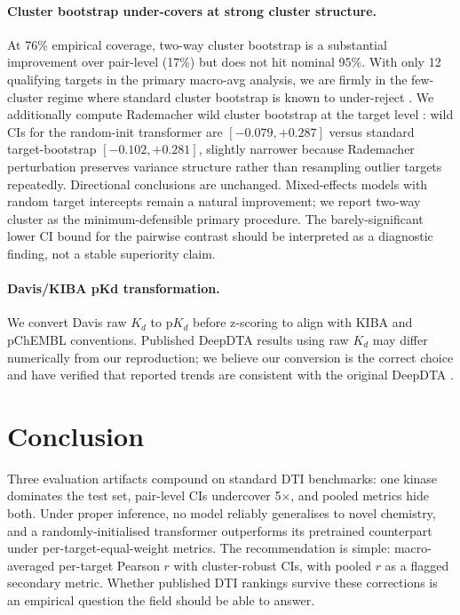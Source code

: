 \documentclass[11pt,a4paper]{article}
\begin{document}
\paragraph{Cluster bootstrap under-covers at strong cluster structure.}
At 76\% empirical coverage, two-way cluster bootstrap is a substantial
improvement over pair-level (17\%) but does not hit nominal 95\%.
With only 12 qualifying targets in the primary macro-avg analysis, we are
firmly in the few-cluster regime where standard cluster bootstrap is known
to under-reject \citep{mackinnon2017wild}.
We additionally compute Rademacher wild cluster bootstrap at the target level
\citep{mackinnon2017wild}: wild CIs for the random-init transformer
are $[-0.079, +0.287]$ versus standard target-bootstrap $[-0.102, +0.281]$,
slightly narrower because Rademacher perturbation preserves variance
structure rather than resampling outlier targets repeatedly.
Directional conclusions are unchanged.
Mixed-effects models with random target intercepts remain a natural
improvement; we report two-way cluster as the minimum-defensible primary
procedure.
The barely-significant lower CI bound for the pairwise contrast should
be interpreted as a diagnostic finding, not a stable superiority claim.

\paragraph{Davis/KIBA pKd transformation.}
We convert Davis raw $K_d$ to $\text{p}K_d$ before z-scoring to align with KIBA
and pChEMBL conventions.
Published DeepDTA results using raw $K_d$ may differ numerically from our
reproduction; we believe our conversion is the correct choice and have
verified that reported trends are consistent with the original DeepDTA
\citep{ozturk2018deepdta}.

\section{Conclusion}

Three evaluation artifacts compound on standard DTI benchmarks: one kinase
dominates the test set, pair-level CIs undercover 5$\times$, and pooled metrics
hide both.
Under proper inference, no model reliably generalises to novel chemistry, and a
randomly-initialised transformer outperforms its pretrained counterpart under
per-target-equal-weight metrics.
The recommendation is simple: macro-averaged per-target Pearson $r$ with
cluster-robust CIs, with pooled $r$ as a flagged secondary metric.
Whether published DTI rankings survive these corrections is an empirical
question the field should be able to answer.
\end{document}
